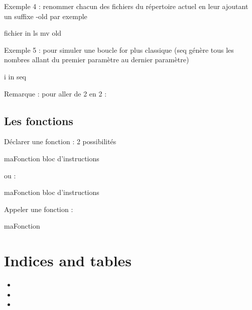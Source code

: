 \documentclass[letterpaper,10pt,french]{sphinxmanual}
\begin{document}
Exemple 4 : renommer chacun des fichiers du répertoire actuel en leur ajoutant un suffixe -old par exemple

%
\begin{sphinxVerbatim}[commandchars=\\\{\}]
 fichier in ls
        mv  \PYGZhy{}old
\end{sphinxVerbatim}

Exemple 5 : pour simuler une boucle for plus classique (seq génère tous les nombres allant du premier paramètre au dernier paramètre)

%
\begin{sphinxVerbatim}[commandchars=\\\{\}]
 i in seq  
         
\end{sphinxVerbatim}

Remarque : pour aller de 2 en 2 : 


\section{Les fonctions}
\label{\detokenize{21-scripts-shell:les-fonctions}}
Déclarer une fonction : 2 possibilités

%
\begin{sphinxVerbatim}[commandchars=\\\{\}]
maFonction 
        bloc d’instructions
\end{sphinxVerbatim}

ou :

%
\begin{sphinxVerbatim}[commandchars=\\\{\}]
 maFonction
        bloc d’instructions
\end{sphinxVerbatim}

Appeler une fonction :

%
\begin{sphinxVerbatim}[commandchars=\\\{\}]
maFonction      
\end{sphinxVerbatim}


\chapter{Indices and tables}
\label{\detokenize{index:indices-and-tables}}\begin{itemize}
\item {} 

\item {} 

\item {} 

\end{itemize}



\renewcommand{\indexname}{Index}
\printindex
\end{document}

